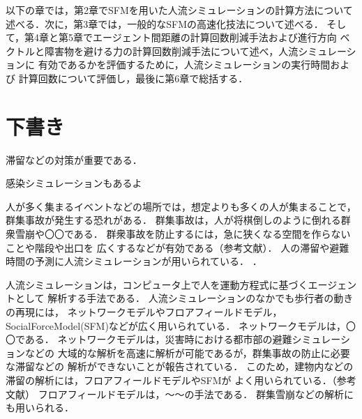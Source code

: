 以下の章では，第2章でSFMを用いた人流シミュレーションの計算方法について
述べる．次に，第3章では，一般的なSFMの高速化技法について述べる．
そして，第4章と第5章でエージェント間距離の計算回数削減手法および進行方向
ベクトルと障害物を避ける力の計算回数削減手法について述べ，人流シミュレーションに
有効であるかを評価するために，人流シミュレーションの実行時間および
計算回数について評価し，最後に第6章で総括する．


\clearpage
\section{下書き}
滞留などの対策が重要である\cite{taisaku1}\cite{taisaku2}．

感染シミュレーションもあるよ\cite{mas_pandemic}

人が多く集まるイベントなどの場所では，想定よりも多くの人が集まることで，
群集事故が発生する恐れがある．
群集事故は，人が将棋倒しのように倒れる群衆雪崩や〇〇である．
群衆事故を防止するには，急に狭くなる空間を作らないことや階段や出口を
広くするなどが有効である（参考文献）．
人の滞留や避難時間の予測に人流シミュレーションが用いられている．
\cite{sim_jirei1}\cite{sim_jirei2}\cite{sim_jirei3}\cite{sim_jirei8}\cite{sim_jirei7}．

人流シミュレーションは，コンピュータ上で人を運動方程式に基づくエージェントとして
解析する手法である．
人流シミュレーションのなかでも歩行者の動きの再現には，
ネットワークモデルやフロアフィールドモデル，SocialForceModel(SFM)などが広く用いられている\cite{helbing_sfm}\cite{sfm_ntt}．
ネットワークモデルは，〇〇である．
ネットワークモデルは，災害時における都市部の避難シミュレーションなどの
大域的な解析を高速に解析が可能であるが，群集事故の防止に必要な滞留などの
解析ができないことが報告されている．
このため，建物内などの滞留の解析には，フロアフィールドモデルやSFMが
よく用いられている．（参考文献）
フロアフィールドモデルは，～～の手法である\cite{floa_field1}\cite{floa_field2}．
群集雪崩などの解析にも用いられる\cite{floa_field3}．



